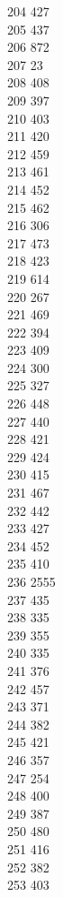 { 204	427 \\
 205	437 \\
 206	872 \\
 207	23 \\
 208	408 \\
 209	397 \\
 210	403 \\
 211	420 \\
 212	459 \\
 213	461 \\
 214	452 \\
 215	462 \\
 216	306 \\
 217	473 \\
 218	423 \\
 219	614 \\
 220	267 \\
 221	469 \\
 222	394 \\
 223	409 \\
 224	300 \\
 225	327 \\
 226	448 \\
 227	440 \\
 228	421 \\
 229	424 \\
 230	415 \\
 231	467 \\
 232	442 \\
 233	427 \\
 234	452 \\
 235	410 \\
 236	2555 \\
 237	435 \\
 238	335 \\
 239	355 \\
 240	335 \\
 241	376 \\
 242	457 \\
 243	371 \\
 244	382 \\
 245	421 \\
 246	357 \\
 247	254 \\
 248	400 \\
 249	387 \\
 250	480 \\
 251	416 \\
 252	382 \\
 253	403 \\
}
